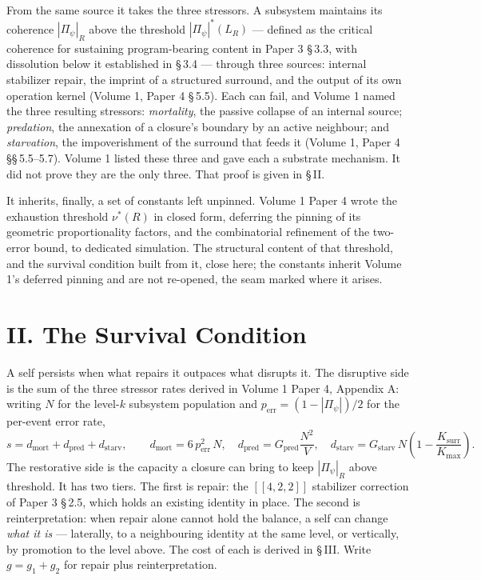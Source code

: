 \documentclass[11pt,oneside]{report}
\theoremstyle{definition}
\theoremstyle{remark}
\begin{document}
From the same source it takes the three stressors. A subsystem maintains its coherence \ensuremath{|\Pi_\psi|_R} above the threshold \ensuremath{|\Pi_\psi|^*(L_R)} --- defined as the critical coherence for sustaining program-bearing content in Paper 3 \S\,3.3, with dissolution below it established in \S\,3.4 --- through three sources: internal stabilizer repair, the imprint of a structured surround, and the output of its own operation kernel (Volume 1, Paper 4 \S\,5.5). Each can fail, and Volume 1 named the three resulting stressors: \emph{mortality}, the passive collapse of an internal source; \emph{predation}, the annexation of a closure's boundary by an active neighbour; and \emph{starvation}, the impoverishment of the surround that feeds it (Volume 1, Paper 4 \S\S\,5.5--5.7). Volume 1 listed these three and gave each a substrate mechanism. It did not prove they are the only three. That proof is given in \S\,II.

It inherits, finally, a set of constants left unpinned. Volume 1 Paper 4 wrote the exhaustion threshold \ensuremath{\nu^*(R)} in closed form, deferring the pinning of its geometric proportionality factors, and the combinatorial refinement of the two-error bound, to dedicated simulation. The structural content of that threshold, and the survival condition built from it, close here; the constants inherit Volume 1's deferred pinning and are not re-opened, the seam marked where it arises.

\section*{II. The Survival Condition}

A self persists when what repairs it outpaces what disrupts it. The disruptive side is the sum of the three stressor rates derived in Volume 1 Paper 4, Appendix A: writing \ensuremath{N} for the level-\ensuremath{k} subsystem population and \ensuremath{p_{\mathrm{err}} = (1 - |\Pi_\psi|)/2} for the per-event error rate,
\[
s = d_{\mathrm{mort}} + d_{\mathrm{pred}} + d_{\mathrm{starv}}, \qquad
d_{\mathrm{mort}} = 6\,p_{\mathrm{err}}^2\,N, \quad
d_{\mathrm{pred}} = G_{\mathrm{pred}}\frac{N^2}{V}, \quad
d_{\mathrm{starv}} = G_{\mathrm{starv}}\,N\!\left(1 - \frac{K_{\mathrm{surr}}}{K_{\max}}\right).
\]
The restorative side is the capacity a closure can bring to keep \ensuremath{|\Pi_\psi|_R} above threshold. It has two tiers. The first is repair: the \ensuremath{[[4,2,2]]} stabilizer correction of Paper 3 \S\,2.5, which holds an existing identity in place. The second is reinterpretation: when repair alone cannot hold the balance, a self can change \emph{what it is} --- laterally, to a neighbouring identity at the same level, or vertically, by promotion to the level above. The cost of each is derived in \S\,III. Write \ensuremath{g = g_1 + g_2} for repair plus reinterpretation.
\end{document}
